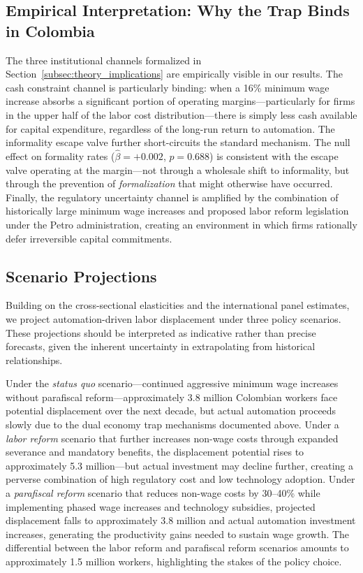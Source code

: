 \documentclass[5p,times,authoryear]{elsarticle}
\begin{document}
\subsection{Empirical Interpretation: Why the Trap Binds in Colombia}
\label{subsec:discussion_trap}

The three institutional channels formalized in Section~\ref{subsec:theory_implications} are empirically visible in our results. The cash constraint channel is particularly binding: when a 16\% minimum wage increase absorbs a significant portion of operating margins---particularly for firms in the upper half of the labor cost distribution---there is simply less cash available for capital expenditure, regardless of the long-run return to automation. The informality escape valve further short-circuits the standard mechanism. The null effect on formality rates ($\hat{\beta} = +0.002$, $p = 0.688$) is consistent with the escape valve operating at the margin---not through a wholesale shift to informality, but through the prevention of \emph{formalization} that might otherwise have occurred. Finally, the regulatory uncertainty channel is amplified by the combination of historically large minimum wage increases and proposed labor reform legislation under the Petro administration, creating an environment in which firms rationally defer irreversible capital commitments.

\subsection{Scenario Projections}
\label{subsec:scenarios}

Building on the cross-sectional elasticities and the international panel estimates, we project automation-driven labor displacement under three policy scenarios. These projections should be interpreted as indicative rather than precise forecasts, given the inherent uncertainty in extrapolating from historical relationships.

Under the \emph{status quo} scenario---continued aggressive minimum wage increases without parafiscal reform---approximately 3.8 million Colombian workers face potential displacement over the next decade, but actual automation proceeds slowly due to the dual economy trap mechanisms documented above. Under a \emph{labor reform} scenario that further increases non-wage costs through expanded severance and mandatory benefits, the displacement potential rises to approximately 5.3 million---but actual investment may decline further, creating a perverse combination of high regulatory cost and low technology adoption. Under a \emph{parafiscal reform} scenario that reduces non-wage costs by 30--40\% while implementing phased wage increases and technology subsidies, projected displacement falls to approximately 3.8 million and actual automation investment increases, generating the productivity gains needed to sustain wage growth. The differential between the labor reform and parafiscal reform scenarios amounts to approximately 1.5 million workers, highlighting the stakes of the policy choice.
\end{document}

